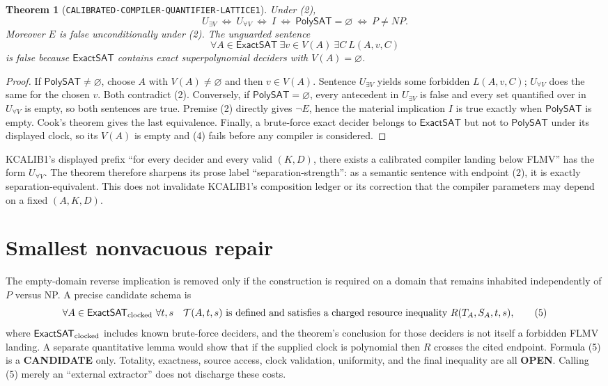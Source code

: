 \documentclass[11pt]{article}
\newtheorem{theorem}{Theorem}
\newcommand{\Dec}{\mathsf{ExactSAT}}
\newcommand{\PolySAT}{\mathsf{PolySAT}}
\newcommand{\CAND}{\textbf{CANDIDATE}}
\newcommand{\OPEN}{\textbf{OPEN}}
\begin{document}
\begin{theorem}[\texttt{CALIBRATED-COMPILER-QUANTIFIER-LATTICE1}]
Under (2),
\[
 U_{\exists V}\ \Longleftrightarrow\ U_{\forall V}
 \ \Longleftrightarrow\ I
 \ \Longleftrightarrow\ \PolySAT=\varnothing
 \ \Longleftrightarrow\ P\ne NP. \tag{3}
\]
Moreover $E$ is false unconditionally under (2).  The unguarded sentence
\[
 \forall A\in\Dec\ \exists v\in V(A)\ \exists C\ L(A,v,C) \tag{4}
\]
is false because $\Dec$ contains exact superpolynomial deciders with
$V(A)=\varnothing$.
\end{theorem}
\begin{proof}
If $\PolySAT\ne\varnothing$, choose $A$ with $V(A)\ne\varnothing$ and then
$v\in V(A)$.  Sentence $U_{\exists V}$ yields some forbidden $L(A,v,C)$;
$U_{\forall V}$ does the same for the chosen $v$.  Both contradict (2).
Conversely, if $\PolySAT=\varnothing$, every antecedent in $U_{\exists V}$
is false and every set quantified over in $U_{\forall V}$ is empty, so both
sentences are true.  Premise (2) directly gives $\neg E$, hence the material
implication $I$ is true exactly when $\PolySAT$ is empty.  Cook's theorem
gives the last equivalence.  Finally, a brute-force exact decider belongs to
$\Dec$ but not to $\PolySAT$ under its displayed clock, so its $V(A)$ is
empty and (4) fails before any compiler is considered.
\end{proof}

KCALIB1's displayed prefix
``for every decider and every valid $(K,D)$, there exists a calibrated
compiler landing below FLMV'' has the form $U_{\forall V}$.  The theorem
therefore sharpens its prose label ``separation-strength'': as a semantic
sentence with endpoint (2), it is exactly separation-equivalent.  This does
not invalidate KCALIB1's composition ledger or its correction that the
compiler parameters may depend on a fixed $(A,K,D)$.

\section{Smallest nonvacuous repair}
The empty-domain reverse implication is removed only if the construction is
required on a domain that remains inhabited independently of $P$ versus NP.
A precise candidate schema is
\[
 \forall A\in\Dec_{\rm clocked}\ \forall t,s\quad
 \mathcal T(A,t,s)\text{ is defined and satisfies a charged resource
 inequality }R(T_A,S_A,t,s), \tag{5}
\]
where $\Dec_{\rm clocked}$ includes known brute-force deciders, and the
theorem's conclusion for those deciders is not itself a forbidden FLMV
landing.  A separate quantitative lemma would show that if the supplied
clock is polynomial then $R$ crosses the cited endpoint.  Formula (5) is a
\CAND{} only.  Totality, exactness, source access, clock validation,
uniformity, and the final inequality are all \OPEN.  Calling (5) merely an
``external extractor'' does not discharge these costs.
\end{document}
